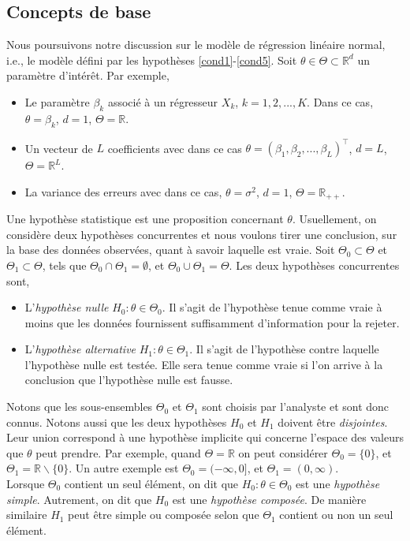 \subsection{Concepts de base}
Nous poursuivons notre discussion sur le modèle de régression linéaire normal, i.e., le modèle défini par  les hypothèses \ref{cond1}-\ref{cond5}. Soit $\theta\in\Theta\subset \mathbb{R}^d$ un paramètre d'intérêt. Par exemple,
\begin{itemize}[label = - ]
\item Le paramètre $\beta_k$ associé à un régresseur $X_k$, $k=1,2,...,K$. Dans ce cas,
$\theta = \beta_k$, $d=1$, $\Theta = \mathbb{R}$.
\item  Un vecteur de $L$ coefficients avec dans ce cas $\theta = (\beta_1, \beta_2,...,\beta_L)^\top$, $d=L$, $\Theta = \mathbb{R}^L$.
\item La variance des erreurs avec dans ce cas, $\theta = \sigma^2$, $d=1$, $\Theta = \mathbb{R}_{++}$.
\end{itemize}
Une hypothèse statistique est une proposition concernant $\theta$. Usuellement, on considère deux hypothèses concurrentes et nous voulons tirer une conclusion, sur la base des données observées, quant à savoir laquelle est vraie. Soit $\Theta_0\subset\Theta$ et  $\Theta_1\subset\Theta$, tels que $\Theta_0 \cap \Theta_1 = \emptyset$, et $\Theta_0 \cup \Theta_1=\Theta$. Les deux hypothèses concurrentes sont,
\begin{itemize}[label = - ]
\item L'\emph{hypothèse nulle} $H_0: \theta\in \Theta_0$. Il s'agit de l'hypothèse tenue comme vraie à moins que les données fournissent suffisamment d'information pour la rejeter.
\item L'\emph{hypothèse alternative} $H_1: \theta\in \Theta_1$. Il s'agit de l'hypothèse contre laquelle l'hypothèse nulle est testée. Elle sera tenue comme vraie si l'on arrive à la conclusion que l'hypothèse nulle est fausse.
\end{itemize}
Notons que les sous-ensembles $\Theta_0$ et $\Theta_1$ sont choisis par l'analyste et sont donc connus. Notons aussi que les deux hypothèses $H_0$ et $H_1$ doivent être
\emph{disjointes}. Leur union correspond à une hypothèse implicite qui concerne l'espace des valeurs que $\theta$ peut prendre. Par exemple, quand $\Theta = \mathbb{R}$ on peut considérer $\Theta_0 = \{0\}$, et $\Theta_1 = \mathbb{R}  \backslash \{0\}$. Un autre exemple est $\Theta_0 = (-\infty, 0]$, et $\Theta_1 = (0, \infty)$.\\
Lorsque $\Theta_0$ contient un seul élément, on dit que $H_0:\theta\in \Theta_0$ est une \emph{hypothèse simple}. Autrement, on dit que $H_0$ est une \emph{hypothèse composée}. De manière similaire $H_1$ peut être simple ou composée selon que $\Theta_1$ contient ou non un seul élément.\\
